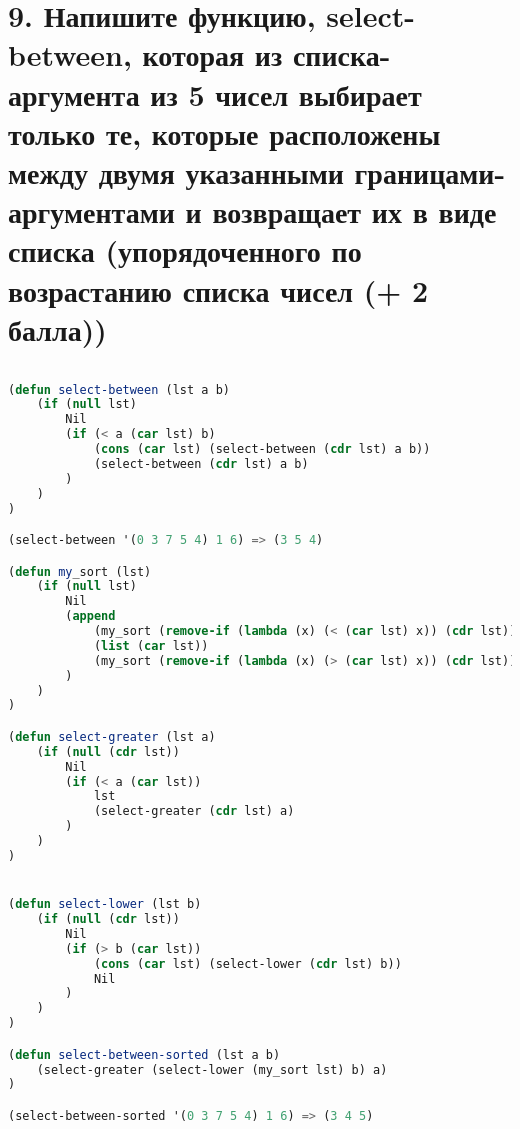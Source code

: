 \documentclass[12pt]{report}
\begin{document}
\section*{9. Напишите функцию, select-between, которая из списка-аргумента из 5 чисел выбирает только те, которые расположены между двумя указанными границами-аргументами и возвращает их в виде списка (упорядоченного по возрастанию списка чисел (+ 2 балла))}

\begin{lstlisting}[language=Lisp]
	
(defun select-between (lst a b)
	(if (null lst)
		Nil
		(if (< a (car lst) b)
			(cons (car lst) (select-between (cdr lst) a b))
			(select-between (cdr lst) a b)
		)
	)
)

(select-between '(0 3 7 5 4) 1 6) => (3 5 4)

(defun my_sort (lst)
	(if (null lst)
		Nil
		(append 
			(my_sort (remove-if (lambda (x) (< (car lst) x)) (cdr lst)))
			(list (car lst))
			(my_sort (remove-if (lambda (x) (> (car lst) x)) (cdr lst)))
		)
	)
)

(defun select-greater (lst a)
	(if (null (cdr lst))
		Nil
		(if (< a (car lst))
			lst
			(select-greater (cdr lst) a)
		)
	)
)


(defun select-lower (lst b)
	(if (null (cdr lst))
		Nil
		(if (> b (car lst))
			(cons (car lst) (select-lower (cdr lst) b))
			Nil
		)
	)
)

(defun select-between-sorted (lst a b)	
	(select-greater (select-lower (my_sort lst) b) a)	
)

(select-between-sorted '(0 3 7 5 4) 1 6) => (3 4 5)

\end{lstlisting}

	

	
\end{document}

